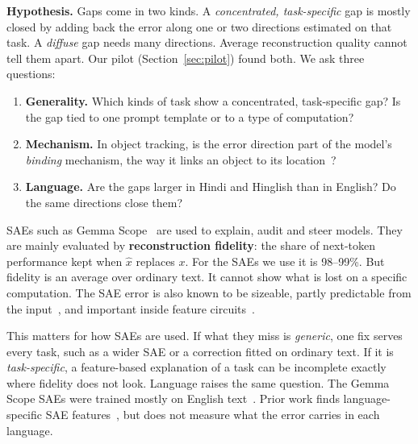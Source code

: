 \documentclass[11pt,a4paper]{article}
\makeatletter
\newcommand{\term}[1]{\textbf{#1}}
\renewcommand\section{\@startsection{section}{1}{\z@}{-1.6ex plus -.4ex}{0.6ex}{\large\bfseries\color{accent}}}
\makeatother
\begin{document}
\textbf{Hypothesis.} Gaps come in two kinds. A \emph{concentrated, task-specific} gap is mostly closed by adding back
the error along one or two directions estimated on that task. A \emph{diffuse} gap needs many directions. Average
reconstruction quality cannot tell them apart. Our pilot (Section~\ref{sec:pilot}) found both. We ask three questions:
\begin{enumerate}[label=\textbf{Q\arabic*.},leftmargin=2.6em]
  \item \textbf{Generality.} Which kinds of task show a concentrated, task-specific gap? Is the gap tied to one prompt
    template or to a type of computation?
  \item \textbf{Mechanism.} In object tracking, is the error direction part of the model's \emph{binding} mechanism,
    the way it links an object to its location~\citep{feng2024bind}?
  \item \textbf{Language.} Are the gaps larger in Hindi and Hinglish than in English? Do the same directions close them?
\end{enumerate}

\section{Why: motivation}

SAEs such as Gemma Scope~\citep{lieberum2024gemmascope} are used to explain, audit and steer models. They are mainly
evaluated by \term{reconstruction fidelity}: the share of next-token performance kept when $\hat{x}$ replaces $x$. For
the SAEs we use it is 98--99\%. But fidelity is an average over ordinary text. It cannot show what is lost on a
specific computation. The SAE error is also known to be sizeable, partly predictable from the
input~\citep{engels2025dark}, and important inside feature circuits~\citep{marks2025sparse}.

This matters for how SAEs are used. If what they miss is \emph{generic}, one fix serves every task, such as a wider SAE
or a correction fitted on ordinary text. If it is \emph{task-specific}, a feature-based explanation of a task can be
incomplete exactly where fidelity does not look. Language raises the same question. The Gemma Scope SAEs were trained
mostly on English text~\citep{lieberum2024gemmascope}. Prior work finds language-specific SAE
features~\citep{deng2025unveiling,brinkmann2025large}, but does not measure what the error carries in each language.
\end{document}
